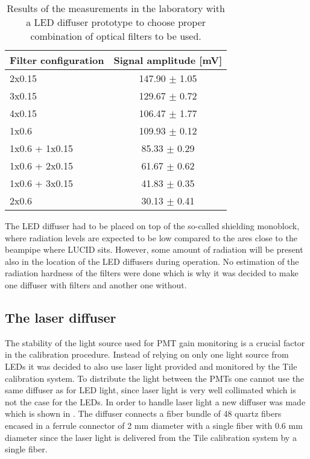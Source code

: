 \begin{table}[bp]
  \begin{tabular}{l|c}
    Filter configuration & Signal amplitude [mV]\\
    \hline
    2x0.15       	&	147.90	$\pm$	1.05	\\
    3x0.15       	&	129.67	$\pm$	0.72	\\
    4x0.15       	&	106.47	$\pm$	1.77	\\
    1x0.6          	&	109.93	$\pm$	0.12	\\
    1x0.6 + 1x0.15 	&	85.33	$\pm$	0.29	\\
    1x0.6 + 2x0.15 	&	61.67	$\pm$	0.62	\\
    1x0.6 + 3x0.15 	&	41.83	$\pm$	0.35	\\
    2x0.6	        &	30.13	$\pm$	0.41	\\
  \end{tabular}
  \caption{Results of the measurements in the laboratory with a LED diffuser prototype to choose proper combination of optical filters to be used.}
  \label{tab:FilterChoice}
\end{table}

The LED diffuser had to be placed on top of the so-called shielding monoblock, where radiation levels are expected to be low compared to the ares 
close to the beampipe where LUCID sits.
However, some amount of radiation will be present also in the location of the LED diffusers during operation.
No estimation of the radiation hardness of the filters were done which is why it was decided to make one diffuser with filters and another one without.


\subsection{The laser diffuser}
\label{subsec:laserDiffuser}

The stability of the light source used for PMT gain monitoring is a crucial factor in the calibration procedure.
Instead of relying on only one light source from LEDs it was decided to also use laser light
provided and monitored by the Tile calibration system. 
To distribute the light between the PMTs one cannot use the same diffuser as for LED light, 
since laser light is very well collimated which is not the case for the LEDs.
In order to handle laser light a new diffuser was made which is shown in .
The diffuser connects a fiber bundle of 48 quartz fibers encased in a ferrule connector of 2 mm diameter with a single fiber with 0.6 mm diameter
since the laser light is delivered from the Tile calibration system by a single fiber.

